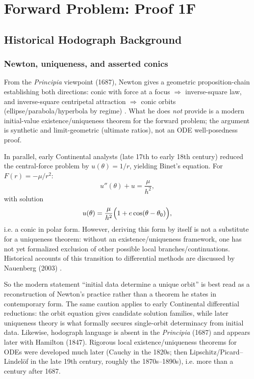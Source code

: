\section{Forward Problem: Proof 1F}
\label{sec:forward-problem-hodograph}
\subsection{Historical Hodograph Background}

\subsubsection{Newton, uniqueness, and asserted conics}

From the \emph{Principia} viewpoint (1687), Newton gives a geometric proposition-chain establishing both directions: conic with force at a focus $\Rightarrow$ inverse-square law, and inverse-square centripetal attraction $\Rightarrow$ conic orbits (ellipse/parabola/hyperbola by regime) \cite{newton1846mottewikisource,chandrasekhar1995principia}. What he does \emph{not} provide is a modern initial-value existence/uniqueness theorem for the forward problem; the argument is synthetic and limit-geometric (ultimate ratios), not an ODE well-posedness proof.

In parallel, early Continental analysts (late 17th to early 18th century) reduced the central-force problem by $u(\theta)=1/r$, yielding Binet's equation. For $F(r)=-\mu/r^2$:
\begin{equation}
  u''(\theta)+u=\frac{\mu}{h^2},
\end{equation}
with solution
\begin{equation}
  u(\theta)=\frac{\mu}{h^2}\Bigl(1+e\cos(\theta-\theta_0)\Bigr),
\end{equation}
i.e. a conic in polar form. However, deriving this form by itself is not a substitute for a uniqueness theorem: without an existence/uniqueness framework, one has not yet formalized exclusion of other possible local branches/continuations. Historical accounts of this transition to differential methods are discussed by Nauenberg (2003) \cite{nauenberg2003keplerarea}.

So the modern statement ``initial data determine a unique orbit'' is best read as a reconstruction of Newton's practice rather than a theorem he states in contemporary form. The same caution applies to early Continental differential reductions: the orbit equation gives candidate solution families, while later uniqueness theory is what formally secures single-orbit determinacy from initial data. Likewise, hodograph language is absent in the \emph{Principia} (1687) and appears later with Hamilton (1847). Rigorous local existence/uniqueness theorems for ODEs were developed much later (Cauchy in the 1820s; then Lipschitz/Picard--Lindel\"of in the late 19th century, roughly the 1870s--1890s), i.e. more than a century after 1687.

